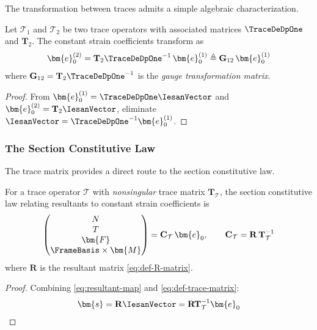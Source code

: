 The transformation between traces admits a simple algebraic characterization.

\begin{proposition}
\label{prop:gauge-transform}
Let $\mathcal{T}_1$ and $\mathcal{T}_2$ be two trace operators with associated 
matrices $\TraceDeDpOne$ and $\mathbf{T}_2$. The constant strain coefficients 
transform as
\begin{equation}
\bm{e}_0^{(2)} = \mathbf{T}_2 \TraceDeDpOne^{-1} \, \bm{e}_0^{(1)} 
\triangleq \mathbf{G}_{12} \, \bm{e}_0^{(1)}
\label{eq:gauge-transform}
\end{equation}
where $\mathbf{G}_{12} = \mathbf{T}_2 \TraceDeDpOne^{-1}$ is the \emph{gauge transformation matrix}.
\end{proposition}

\begin{proof}
From $\bm{e}_0^{(1)} = \TraceDeDpOne \IesanVector$ and $\bm{e}_0^{(2)} = \mathbf{T}_2 \IesanVector$, 
eliminate $\IesanVector = \TraceDeDpOne^{-1} \bm{e}_0^{(1)}$.
\end{proof}

\subsubsection{The Section Constitutive Law}

The trace matrix provides a direct route to the section constitutive law.

\begin{proposition}
\label{thm:constitutive-law}
For a trace operator $\mathcal{T}$ with \emph{nonsingular} trace matrix $\mathbf{T}_{\mathcal{T}}$, 
the section constitutive law relating resultants to constant strain coefficients is
\begin{equation}
\begin{pmatrix} N \\ T \\ \bm{F} \\ \FrameBasis \times \bm{M} \end{pmatrix}
= \mathbf{C}_{\mathcal{T}} \, \bm{e}_0, 
\qquad 
\mathbf{C}_{\mathcal{T}} = \mathbf{R} \, \mathbf{T}_{\mathcal{T}}^{-1}
\label{eq:constitutive-law}
\end{equation}
where $\mathbf{R}$ is the resultant matrix \eqref{eq:def-R-matrix}.
\end{proposition}

\begin{proof}
Combining \eqref{eq:resultant-map} and \eqref{eq:def-trace-matrix}:
\begin{equation*}
\bm{s} = \mathbf{R} \IesanVector = \mathbf{R} \mathbf{T}_{\mathcal{T}}^{-1} \bm{e}_0
\end{equation*}
\end{proof}

